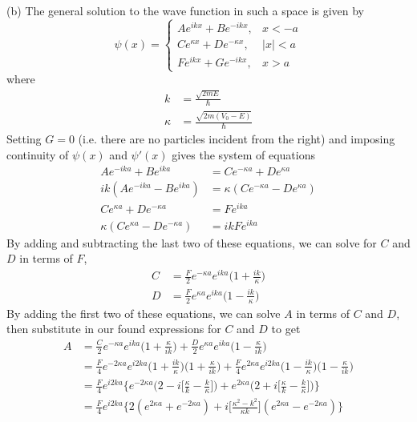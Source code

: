 \documentclass[../principles-of-quantum-mechanics.tex]{subfiles}
\begin{document}
\begin{questions}
\begin{solution}
		(b) The general solution to the wave function in such a space is given by
		$$\psi(x) = \begin{cases}
			Ae^{ikx} + Be^{-ikx}, &x < -a \\
			Ce^{\kappa x} + De^{-\kappa x}, & |x| < a \\
			Fe^{ikx} + Ge^{-ikx}, &x > a
		\end{cases}$$
		where
		\begin{align*}
			k &= \frac{\sqrt{2mE}}{\hbar} \\
			\kappa &= \frac{\sqrt{2m(V_0 - E)}}{\hbar}
		\end{align*}
		Setting $G = 0$ (i.e. there are no particles incident from the right) and imposing continuity of $\psi(x)$ and $\psi'(x)$ gives the system of equations
		\begin{align*}
			Ae^{-ika} + Be^{ika} &= Ce^{-\kappa a} + De^{\kappa a} \\
			ik(Ae^{-ika} - Be^{ika}) &= \kappa (Ce^{-\kappa a} - De^{\kappa a}) \\
			Ce^{\kappa a} + De^{-\kappa a} &= Fe^{ika} \\
			\kappa(Ce^{\kappa a} - De^{-\kappa a}) &= ikFe^{ika}
		\end{align*}
		By adding and subtracting the last two of these equations, we can solve for $C$ and $D$ in terms of $F$,
		\begin{align*}
			C &= \frac{F}{2}e^{-\kappa a}e^{ika}\Big(1 + \frac{ik}{\kappa}\Big) \\
			D &= \frac{F}{2}e^{\kappa a}e^{ika}\Big(1 - \frac{ik}{\kappa}\Big)
		\end{align*}
		By adding the first two of these equations, we can solve $A$ in terms of $C$ and $D$, then substitute in our found expressions for $C$ and $D$ to get
		\begin{align*}
			A &= \frac{C}{2}e^{-\kappa a}e^{ika}\Big(1 + \frac{\kappa}{ik}\Big) + \frac{D}{2}e^{\kappa a}e^{ika}\Big(1 - \frac{\kappa}{ik}\Big) \\
			&= \frac{F}{4}e^{-2\kappa a}e^{i2ka}\Big(1 + \frac{ik}{\kappa}\Big)\Big(1 + \frac{\kappa}{ik}\Big) + \frac{F}{4}e^{2\kappa a}e^{i2ka}\Big(1 - \frac{ik}{\kappa}\Big)\Big(1 - \frac{\kappa}{ik}\Big) \\
			&= \frac{F}{4}e^{i2ka}\Big\{e^{-2\kappa a}\Big(2 - i\Big[\frac{\kappa}{k} - \frac{k}{\kappa}\Big]\Big) + e^{2\kappa a}\Big(2 + i\Big[\frac{\kappa}{k} - \frac{k}{\kappa}\Big]\Big)\Big\} \\
			&= \frac{F}{4}e^{i2ka}\Big\{2(e^{2\kappa a} + e^{-2\kappa a}) + i\Big[\frac{\kappa^2 - k^2}{\kappa k}\Big](e^{2\kappa a} - e^{-2\kappa a})\Big\} \\

\end{align*}
\end{solution}
\end{questions}
\end{document}
